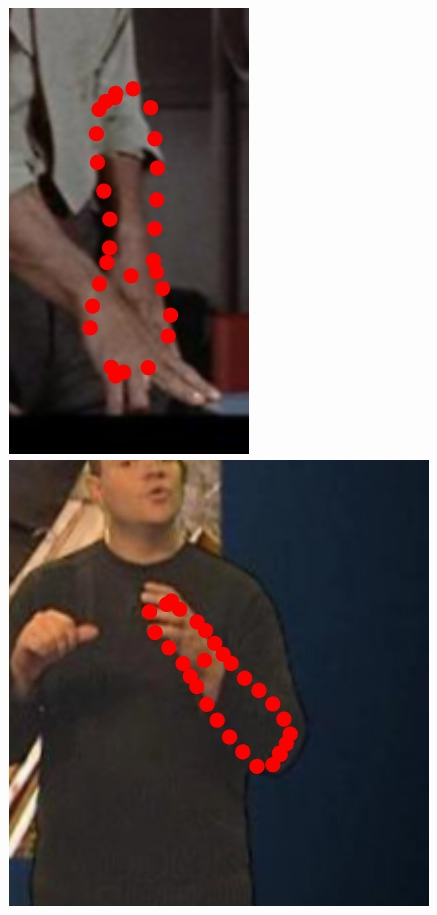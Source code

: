 \begin{figure}
    \hfill
    \includegraphics[height=\ofh]{resources/Annotation_Correction/Suplementory_Meterial/ExFit/0026}
    \hfill
    \includegraphics[height=\ofh]{resources/Annotation_Correction/Suplementory_Meterial/ExFit/0027}
    \hfill

\end{figure}
